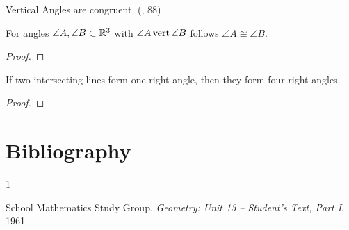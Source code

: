 \begin{theorem}[4-7.]\label{thm:4-7.}
  Vertical Angles are congruent.
  (\cite{SMSGGeometry}, 88)

  For angles $\angle A,\angle B \subset \mathbb{R}^3$ with ${\angle A}\operatorname{vert}{\angle B}$ follows $\angle A \cong \angle B$.
\end{theorem}

\begin{proof}
\end{proof}

\begin{theorem}[4-8.]\label{thm:4-8.}
  If two intersecting lines form one right angle, then they form four right angles.
\end{theorem}

\begin{proof}
\end{proof}












\section{Bibliography}
	
	\begin{thebibliography}{1}

    School Mathematics Study Group, \textit{Geometry: Unit 13 -- Student's Text, Part I}, 1961


	\end{thebibliography}
